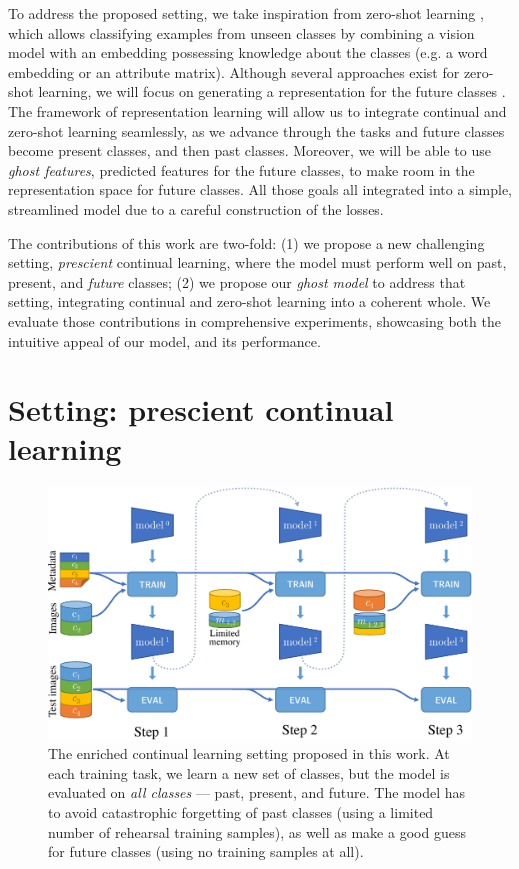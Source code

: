 To address the proposed setting, we take inspiration from zero-shot learning
\cite{lampert2009zeroshot, xian2019awa2}, which allows classifying examples from unseen classes by
combining a vision model with an embedding possessing knowledge about the classes (e.g. a word
embedding \cite{mikolov2013word2vec,pennington2014glove} or an attribute matrix). Although several
approaches exist for zero-shot learning, we will focus on generating a representation for the future
classes \cite{bucher2017zeroshot_gmmn, kumar2018synthesized_zeroshot,
    xian2018feature_generating_zeroshot}. The framework of representation learning will allow us to
integrate continual and zero-shot learning seamlessly, as we advance through the tasks and future
classes become present classes, and then past classes. Moreover, we will be able to use
\textit{ghost features}, predicted features for the future classes, to make room in the
representation space for future classes. All those goals all integrated into a simple, streamlined
model due to a careful construction of the losses.

The contributions of this work are two-fold: (1) we propose a new challenging setting,
\textit{prescient} continual learning, where the model must perform well on past, present, and
\textit{future} classes; (2) we propose our \textit{ghost model} to address that setting,
integrating continual and zero-shot learning into a coherent whole. We evaluate those contributions
in comprehensive experiments, showcasing both the intuitive appeal of our model, and its
performance.


\section{Setting: prescient continual learning}

\label{sec:setting}
\begin{figure}
    \centering
    \includegraphics[width=0.7\linewidth]{images/ghost/protocol.pdf}
    \caption{The enriched continual learning setting proposed in this work. At each training task,
        we learn a new set of classes, but the model is evaluated on \textit{all classes} --- past,
        present, and future. The model has to avoid catastrophic forgetting of past classes (using a
        limited number of rehearsal training samples), as well as make a good guess for future classes
        (using no training samples at all).}
    \label{fig:protocol_zeroshot_continual}
\end{figure}


